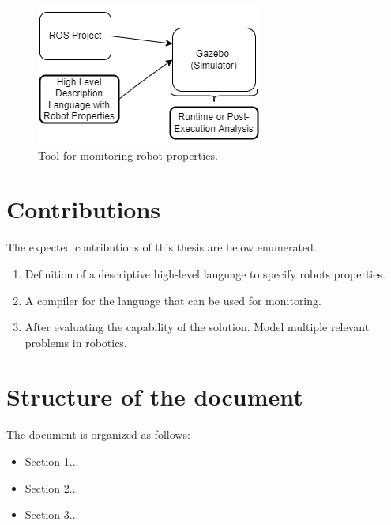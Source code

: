 \begin{figure}[h!]
    \includegraphics{images/intro_diag.png}
    \caption{Tool for monitoring robot properties.}
    \label{fig:intro_objectives}
\end{figure}

\section{Contributions}
\label{sec:contributions}

The expected contributions of this thesis are below enumerated.

\begin{enumerate}
    \item Definition of a descriptive high-level language to specify robots properties.
    \item A compiler for the language that can be used for monitoring.
    \item After evaluating the capability of the solution. Model multiple relevant problems in robotics.
\end{enumerate}

\section{Structure of the document}
\label{sec:structure}

The document is organized as follows:

\begin{itemize}
    \item Section 1...
    \item Section 2...
    \item Section 3...
\end{itemize}

